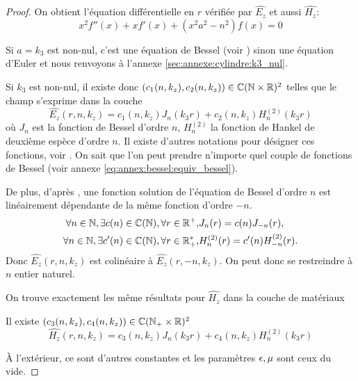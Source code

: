\begin{proof}
    On obtient l'équation différentielle en \(r\) vérifiée par \(\hat{E_z}\) et aussi \(\hat{H_z}\):
    \begin{equation*}
      x^2 f''(x) + xf'(x) + \left(x^2a^2 - n^2\right)f(x) = 0
    \end{equation*}

    Si \(a = k_3\) est non-nul, c'est une équation de Bessel (voir \cite[eq (6.80)]{bowman_introduction_1958}) sinon une équation d'Euler et nous renvoyons à l'annexe \ref{sec:annexe:cylindre:k3_nul}.

    Si \(k_3\) est non-nul, il existe donc \((c_1(n,k_z),c_2(n,k_z)) \in \mathbb C(\mathbb N\times\mathbb R)^2\) telles que le champ s'exprime dans la couche
    \begin{equation*}
          \hat{E_z}(r,n,k_z) = c_1(n,k_z) J_n\left(k_3r\right) + c_2(n,k_z) H_n^{(2)}\left(k_3r\right)
    \end{equation*}
    où \(J_n\) est la fonction de Bessel d'ordre \(n\), \(H_n^{(2)}\) la fonction de Hankel de deuxième espèce d'ordre \(n\). Il existe d'autres notations pour désigner ces fonctions,  voir \cite[p.~358]{abramowitz_handbook_1964}.
    On sait que l'on peut prendre n'importe quel couple de fonctions de Bessel (voir annexe \eqref{eq:annex:bessel:equiv_bessel}).

    De plus, d'après \cite[p.~358]{abramowitz_handbook_1964}, une fonction solution de l'équation de Bessel d'ordre \(n\) est linéairement dépendante de la même fonction d'ordre \(-n\).
    \begin{align*}
       \forall n \in \mathbb N, \exists c(n) \in \mathbb C(\mathbb N), \forall r \in \mathbb R^+,& J_n(r) = c(n)J_{-n}(r),
       \\
       \forall n \in \mathbb N, \exists c'(n) \in \mathbb C(\mathbb N), \forall r \in \mathbb R_+^*,& H_n^{(2)}(r) = c'(n)H_{-n}^{(2)}(r).
    \end{align*}
    Donc  \(\hat{E_z}(r,n,k_z)\) est colinéaire à  \(\hat{E_z}(r,-n,k_z)\).
    On peut donc se restreindre à \(n\) entier naturel.

    On trouve exactement les même résultats pour \(\hat{H_z}\) dans la couche de matériaux

    Il existe \((c_3(n,k_z),c_4(n,k_z)) \in \mathbb C(\mathbb N_+\times\mathbb R)^2\)
    \begin{equation*}
      \hat{H_z}(r,n,k_z) = c_3(n,k_z) J_n\left(k_3r\right) + c_4(n,k_z) H_n^{(2)}\left(k_3r\right)
    \end{equation*}

    À l'extérieur, ce sont d'autres constantes et les paramètres \(\epsilon,\mu\) sont ceux du vide. 
  \end{proof}

